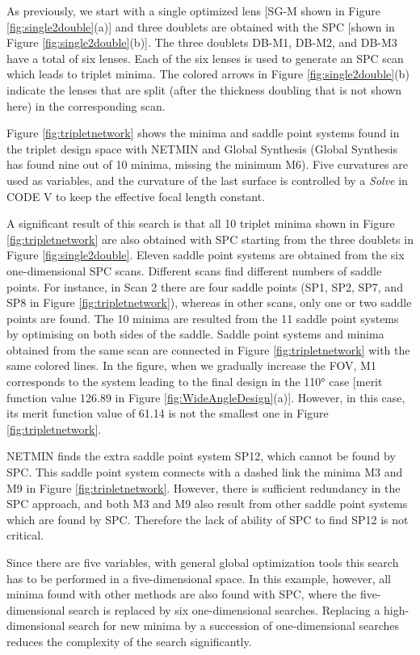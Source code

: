 As previously, we start with a single optimized lens [SG-M shown in Figure \ref{fig:single2double}(a)] and three doublets are obtained with the SPC [shown in Figure \ref{fig:single2double}(b)]. The three doublets DB-M1, DB-M2, and DB-M3 have a total of six lenses.  Each of the six lenses is used to generate an SPC scan which leads to triplet minima. The colored arrows in Figure \ref{fig:single2double}(b) indicate the lenses that are split (after the thickness doubling that is not shown here) in the corresponding scan.

Figure \ref{fig:tripletnetwork} shows the minima and saddle point systems found in the triplet design space with NETMIN and Global Synthesis (Global Synthesis has found nine out of 10 minima, missing the minimum M6). Five curvatures are used as variables, and the curvature of the last surface is controlled by a \textit{Solve} in CODE V to keep the effective focal length constant.

A significant result of this search is that all 10 triplet minima shown in Figure \ref{fig:tripletnetwork} are also obtained with SPC starting from the three doublets in Figure \ref{fig:single2double}. Eleven saddle point systems are obtained from the six one-dimensional SPC scans. Different scans find different numbers of saddle points. For instance, in Scan 2 there are four saddle points (SP1, SP2, SP7, and SP8 in Figure \ref{fig:tripletnetwork}), whereas in other scans, only one or two saddle points are found. The 10 minima are resulted from the 11 saddle point systems by optimising on both sides of the saddle. Saddle point systems and minima obtained from the same scan are connected in Figure \ref{fig:tripletnetwork} with the same colored lines. In the figure, when we gradually increase the FOV, M1 corresponds to the system leading to the final design in the 110° case [merit function value 126.89 in Figure \ref{fig:WideAngleDesign}(a)]. However, in this case, its merit function value of 61.14 is not the smallest one in Figure \ref{fig:tripletnetwork}.

NETMIN finds the extra saddle point system SP12, which cannot be found by SPC. This saddle point system connects with a dashed link the minima M3 and M9 in Figure \ref{fig:tripletnetwork}. However, there is sufficient redundancy in the SPC approach, and both M3 and M9 also result from other saddle point systems which are found by SPC. Therefore the lack of ability of SPC to find SP12 is not critical.

Since there are five variables, with general global optimization tools this search has to be performed in a five-dimensional space. In this example, however, all minima found with other methods are also found with SPC, where the five-dimensional search is replaced by six one-dimensional searches. Replacing a high-dimensional search for new minima by a succession of one-dimensional searches reduces the complexity of the search significantly.

